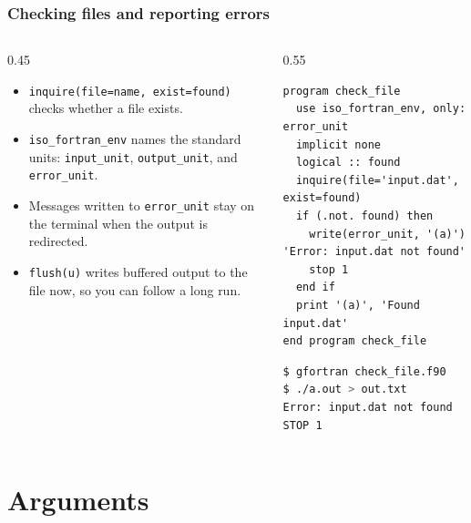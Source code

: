 \begin{frame}[fragile]
  \frametitle{Checking files and reporting errors}
  \begin{columns}[T]
    \begin{column}{0.45\textwidth}
      \begin{itemize}
        \item \texttt{inquire(file=name, exist=found)} checks whether a file exists.
        \item \texttt{iso\_fortran\_env} names the standard units: \texttt{input\_unit}, \texttt{output\_unit}, and \texttt{error\_unit}.
        \item Messages written to \texttt{error\_unit} stay on the terminal when the output is redirected.
        \item \texttt{flush(u)} writes buffered output to the file now, so you can follow a long run.
      \end{itemize}
    \end{column}

    \begin{column}{0.55\textwidth}
      \begin{lstlisting}
program check_file
  use iso_fortran_env, only: error_unit
  implicit none
  logical :: found
  inquire(file='input.dat', exist=found)
  if (.not. found) then
    write(error_unit, '(a)') 'Error: input.dat not found'
    stop 1
  end if
  print '(a)', 'Found input.dat'
end program check_file
      \end{lstlisting}
      \begin{lstlisting}[language=bash]
$ gfortran check_file.f90
$ ./a.out > out.txt
Error: input.dat not found
STOP 1
      \end{lstlisting}
    \end{column}
  \end{columns}
\end{frame}


\section{Arguments}

